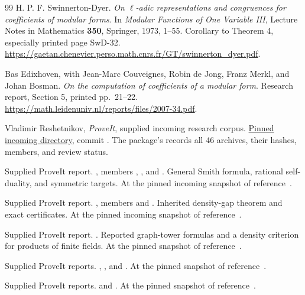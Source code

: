 \begin{thebibliography}{99}
H. P. F. Swinnerton-Dyer.
\emph{On \(\ell\)-adic representations and congruences for coefficients
of modular forms}.
In \emph{Modular Functions of One Variable III}, Lecture Notes in
Mathematics \textbf{350}, Springer, 1973, 1--55.
Corollary to Theorem 4, especially printed page SwD-32.
\url{https://gaetan.chenevier.perso.math.cnrs.fr/GT/swinnerton_dyer.pdf}.

Bas Edixhoven, with Jean-Marc Couveignes, Robin de Jong,
Franz Merkl, and Johan Bosman.
\emph{On the computation of coefficients of a modular form}.
Research report, Section 5, printed pp.~21--22.
\url{https://math.leidenuniv.nl/reports/files/2007-34.pdf}.

Vladimir Reshetnikov, \emph{ProveIt}, supplied incoming research corpus.
\href{https://github.com/VladimirReshetnikov/ProveIt/tree/5cc267af75a635199ac5d93a7d49cbce521daefc/docs/incoming}{Pinned incoming directory},
commit \priorcommit.
The package's  records all 46 archives,
their hashes, members, and review status.

Supplied ProveIt report.
,
members , ,
and .
General Smith formula, rational self-duality, and symmetric targets.
At the pinned incoming snapshot of reference~\cite{priorinventory}.

Supplied ProveIt report.
,
members  and
.
Inherited density-gap theorem and exact certificates.
At the pinned incoming snapshot of reference~\cite{priorinventory}.

Supplied ProveIt report.
.
Reported graph-tower formulas and a density criterion for products of
finite fields. At the pinned snapshot of reference~\cite{priorinventory}.

Supplied ProveIt reports.
,
, and
.
At the pinned snapshot of reference~\cite{priorinventory}.

Supplied ProveIt reports.
 and
.
At the pinned snapshot of reference~\cite{priorinventory}.


\end{thebibliography}
